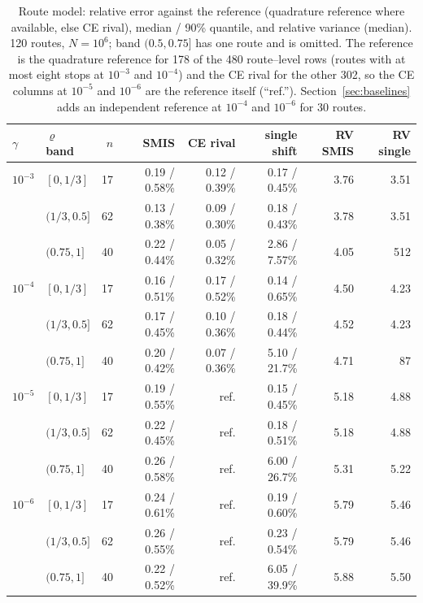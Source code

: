 \documentclass[ijoc,sglanonrev]{informs4}
\begin{document}
\begin{table}[t]
\centering\small
\caption{Route model: relative error against the reference (quadrature
reference where available, else CE rival), median / 90\% quantile, and relative
variance (median). 120 routes, $N=10^6$; band $(0.5,0.75]$ has one route and
is omitted. The reference is the quadrature reference for 178 of the 480
route--level rows (routes with at most eight stops at $10^{-3}$ and $10^{-4}$)
and the CE rival for the other 302, so the CE columns at $10^{-5}$ and
$10^{-6}$ are the reference itself (``ref.''). Section~\ref{sec:baselines}
adds an independent reference at $10^{-4}$ and $10^{-6}$ for 30 routes.}
\label{tab:routes}
\begin{tabular}{llrrrrrr}
\toprule
$\gamma$ & $\varrho$ band & $n$ & SMIS & CE rival & single shift & RV SMIS & RV single \\
\midrule
$10^{-3}$ & $[0,1/3]$ & 17 & 0.19 / 0.58\% & 0.12 / 0.39\% & 0.17 / 0.45\% & 3.76 & 3.51 \\
 & $(1/3,0.5]$ & 62 & 0.13 / 0.38\% & 0.09 / 0.30\% & 0.18 / 0.43\% & 3.78 & 3.51 \\
 & $(0.75,1]$ & 40 & 0.22 / 0.44\% & 0.05 / 0.32\% & 2.86 / 7.57\% & 4.05 & 512 \\
$10^{-4}$ & $[0,1/3]$ & 17 & 0.16 / 0.51\% & 0.17 / 0.52\% & 0.14 / 0.65\% & 4.50 & 4.23 \\
 & $(1/3,0.5]$ & 62 & 0.17 / 0.45\% & 0.10 / 0.36\% & 0.18 / 0.44\% & 4.52 & 4.23 \\
 & $(0.75,1]$ & 40 & 0.20 / 0.42\% & 0.07 / 0.36\% & 5.10 / 21.7\% & 4.71 & 87 \\
$10^{-5}$ & $[0,1/3]$ & 17 & 0.19 / 0.55\% & ref. & 0.15 / 0.45\% & 5.18 & 4.88 \\
 & $(1/3,0.5]$ & 62 & 0.22 / 0.45\% & ref. & 0.18 / 0.51\% & 5.18 & 4.88 \\
 & $(0.75,1]$ & 40 & 0.26 / 0.58\% & ref. & 6.00 / 26.7\% & 5.31 & 5.22 \\
$10^{-6}$ & $[0,1/3]$ & 17 & 0.24 / 0.61\% & ref. & 0.19 / 0.60\% & 5.79 & 5.46 \\
 & $(1/3,0.5]$ & 62 & 0.26 / 0.55\% & ref. & 0.23 / 0.54\% & 5.79 & 5.46 \\
 & $(0.75,1]$ & 40 & 0.22 / 0.52\% & ref. & 6.05 / 39.9\% & 5.88 & 5.50 \\
\bottomrule
\end{tabular}
\end{table}
\end{document}

